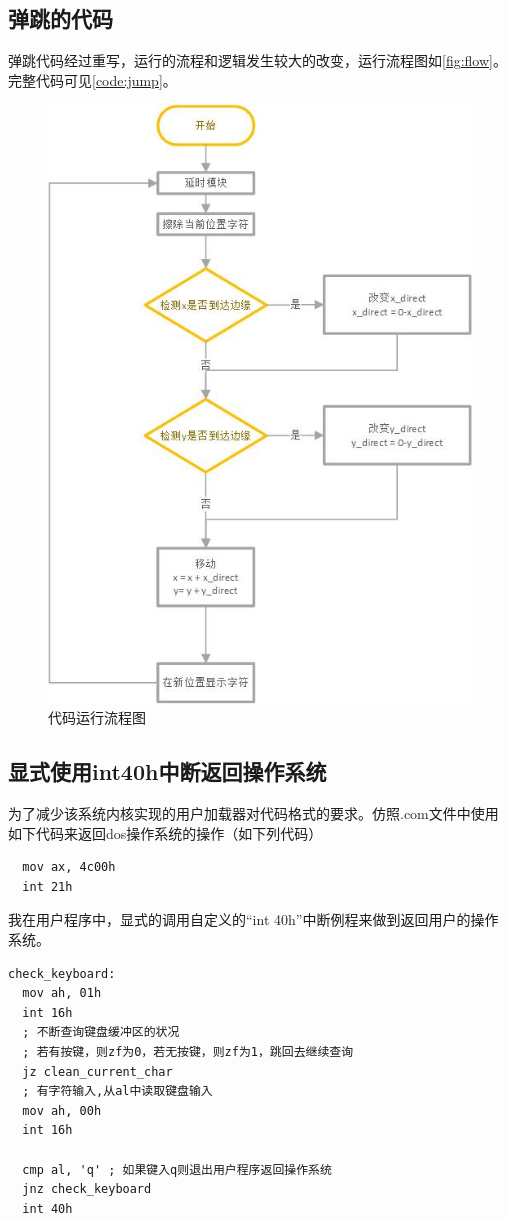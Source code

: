 \documentclass[forprint]{WHUBachelor}
\begin{document}
\subsection{弹跳的代码}
弹跳代码经过重写，运行的流程和逻辑发生较大的改变，运行流程图如\autoref{fig:flow}。完整代码可见\autoref{code:jump}。

\begin{figure}[htp]
  \centering
  \includegraphics[width=13cm]{"./figure/figure.jpg"}
  \caption{代码运行流程图}
  \label{fig:flow}
\end{figure}

\cleardoublepage

\subsection{显式使用int40h中断返回操作系统}
为了减少该系统内核实现的用户加载器对代码格式的要求。仿照.com文件中使用如下代码来返回dos操作系统的操作（如下列代码）
\begin{lstlisting}
  mov ax, 4c00h
  int 21h
\end{lstlisting}
我在用户程序中，显式的调用自定义的“int 40h”中断例程来做到返回用户的操作系统。
\begin{lstlisting}[language={[x86masm]Assembler}]
check_keyboard:
  mov ah, 01h
  int 16h
  ; 不断查询键盘缓冲区的状况
  ; 若有按键，则zf为0，若无按键，则zf为1，跳回去继续查询
  jz clean_current_char
  ; 有字符输入,从al中读取键盘输入
  mov ah, 00h
  int 16h

  cmp al, 'q' ; 如果键入q则退出用户程序返回操作系统
  jnz check_keyboard
  int 40h
\end{lstlisting}
\end{document}
